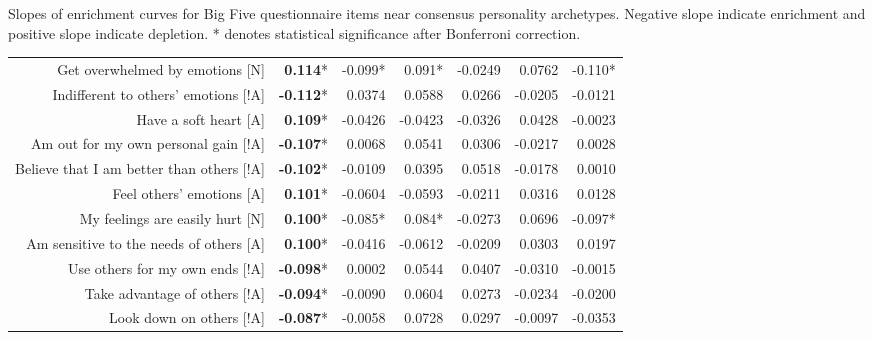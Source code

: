 Slopes of enrichment curves for Big Five questionnaire items near consensus personality archetypes. Negative slope indicate enrichment and positive slope indicate depletion. * denotes statistical significance after Bonferroni correction.\\

\newcommand{\mcc}[1]{\multicolumn{1}{R{1.3cm}}{#1}}

{
\centering
\footnotesize
\hspace{-2cm}
\begin{tabular}{rrrrrrr}
\toprule
{} 				& \mcc{\smallachiever} 		& \mcc{\smallhost} 			& \mcc{\smallwildcard} & \mcc{\smallloyalist} 		& \mcc{\smallhippie} 			&  \mcc{\smallfollower} \\
\midrule
Get overwhelmed by emotions [N]                           & \textbf{0.114}* &-0.099* & 0.091* &-0.0249 & 0.0762 &-0.110*\\
Indifferent to others' emotions [!A]             &\textbf{-0.112}* & 0.0374 & 0.0588 & 0.0266 &-0.0205 &-0.0121\\
Have a soft heart [A]                                     & \textbf{0.109}* &-0.0426 &-0.0423 &-0.0326 & 0.0428 &-0.0023\\
Am out for my own personal gain [!A]                      &\textbf{-0.107}* & 0.0068 & 0.0541 & 0.0306 &-0.0217 & 0.0028\\
Believe that I am better than others [!A]                 &\textbf{-0.102}* &-0.0109 & 0.0395 & 0.0518 &-0.0178 & 0.0010\\
Feel others' emotions [A]                                 & \textbf{0.101}* &-0.0604 &-0.0593 &-0.0211 & 0.0316 & 0.0128\\
My feelings are easily hurt [N]                           & \textbf{0.100}* &-0.085* & 0.084* &-0.0273 & 0.0696 &-0.097*\\
Am sensitive to the needs of others [A]                   & \textbf{0.100}* &-0.0416 &-0.0612 &-0.0209 & 0.0303 & 0.0197\\
Use others for my own ends [!A]                           &\textbf{-0.098}* & 0.0002 & 0.0544 & 0.0407 &-0.0310 &-0.0015\\
Take advantage of others [!A]                             &\textbf{-0.094}* &-0.0090 & 0.0604 & 0.0273 &-0.0234 &-0.0200\\
Look down on others [!A]                                  &\textbf{-0.087}* &-0.0058 & 0.0728 & 0.0297 &-0.0097 &-0.0353\\

\end{tabular}}
